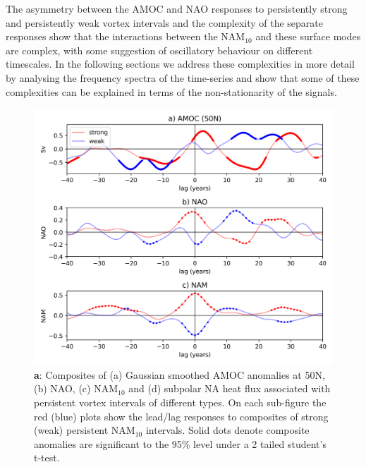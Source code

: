 The asymmetry between the AMOC and NAO responses to persistently strong and persistently weak vortex intervals and the complexity of the separate responses show that the interactions between the NAM$_{10}$ and these surface modes are complex, with some suggestion of oscillatory behaviour on different timescales. In the following sections we address these complexities in more detail by analysing the frequency spectra of the time-series and show that some of these complexities can be explained in terms of the non-stationarity of the signals.

\begin{figure}[h!]
\begin{center}
\noindent\includegraphics[width =\linewidth]{Figures/Figures-surface/AMOC_NAO_NAM_responses_each_event_type.png} 
\caption{\textbf{a}: Composites of (a) Gaussian smoothed AMOC anomalies at 50N, (b) NAO, (c) NAM$_{10}$ and (d) subpolar NA heat flux associated with persistent vortex intervals of different types. On each sub-figure the red (blue) plots show the lead/lag responses to composites of strong (weak) persistent NAM$_{10}$ intervals. Solid dots denote composite anomalies are significant to the 95\% level under a 2 tailed student's t-test.}
\label{NAO_AMOC_response_individual_types}
\end{center}
\end{figure}


